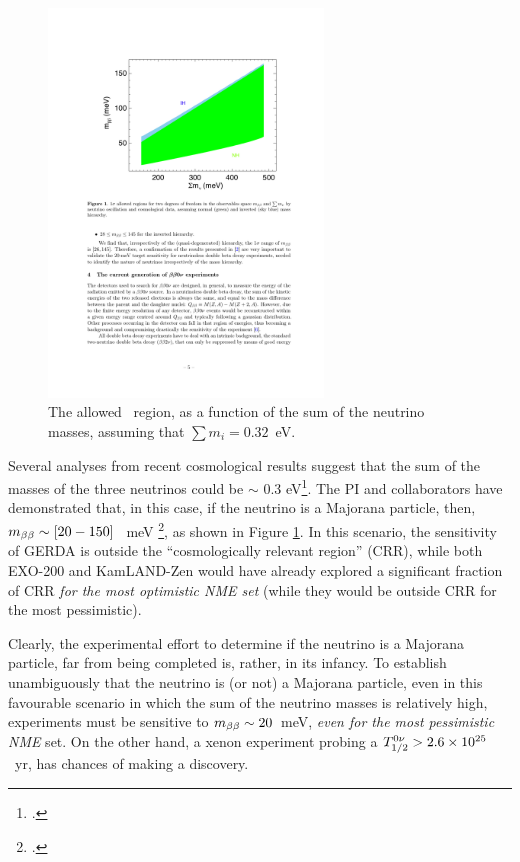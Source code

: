 \begin{figure}
\centering
\includegraphics[width=0.65\textwidth]{img/Mbb.pdf}
\caption{The allowed \mbb\ region, as a function of the sum of the neutrino masses, assuming that 
$\sum m_i = 0.32$~eV.} \label{fig.mbb}
\end{figure}

 Several analyses from recent cosmological results suggest that the sum of the masses of the three neutrinos could be $\sim$ 0.3 eV\footcite{PhysRevLett.112.051303}. The PI and collaborators have demonstrated that, in this case, if the neutrino is a Majorana particle, then, $m_{\beta\beta} \sim [20-150]$~ meV \footcite{GomezCadenas:2013ue}, as shown in Figure \ref{fig.mbb}. In this scenario, the sensitivity of GERDA is outside the ``cosmologically relevant region'' (CRR), while both EXO-200 and KamLAND-Zen would have already explored a significant fraction of CRR {\em for the most optimistic NME set} (while they would be outside CRR for the most pessimistic). 
 
 Clearly, the experimental effort to determine if the neutrino is a Majorana particle, far from being completed is, rather, in its infancy. To establish unambiguously that the neutrino is (or not) a Majorana particle, even in this favourable scenario in which the sum of the neutrino masses is relatively high, experiments must be sensitive to $m_{\beta\beta} \sim 20$~meV, {\em even for the most pessimistic NME} set. On the other hand, a xenon experiment probing a $T_{1/2}^{0\nu} >2.6 \times 10^{25}$~yr, has chances of making a discovery.
 

